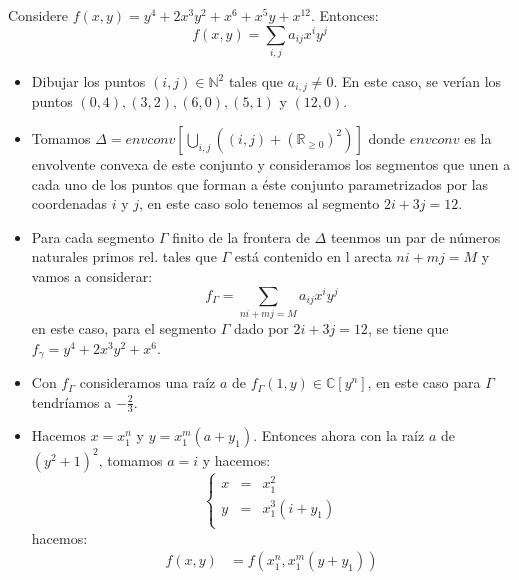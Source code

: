\documentclass[12pt]{report}
\newcounter{it}
\theoremstyle{largebreak}
\begin{document}
    \begin{exa}
        Considere $f(x,y)=y^4+2x^3y^2+x^6+x^5y+x^12$. Entonces:
        \begin{equation*}
            f(x,y)=\sum_{i,j}a_{ ij}x^iy^j
        \end{equation*}
        \begin{itemize}
            \item Dibujar los puntos $(i,j)\in\mathbb{N}^2$ tales que $a_{ i,j}\neq0$. En este caso, se verían los puntos $(0,4),(3,2),(6,0),(5,1)$ y $(12,0)$.
            \item Tomamos $\Delta=envconv\left[\bigcup_{ i,j}\left((i,j)+(\mathbb{R}_{\geq0})^2\right)\right]$ donde $envconv$ es la envolvente convexa de este conjunto y consideramos los segmentos que unen a cada uno de los puntos que forman a éste conjunto parametrizados por las coordenadas $i$ y $j$, en este caso solo tenemos al segmento $2i+3j=12$.
            \item Para cada segmento $\Gamma$ finito de la frontera de $\Delta$ teenmos un par de números naturales primos rel. tales que $\Gamma$ está contenido en l arecta $ni+mj=M$ y vamos a considerar:
            \begin{equation*}
                f_\Gamma=\sum_{ ni+mj=M}a_{ij}x^iy^j
            \end{equation*}
            en este caso, para el segmento $\Gamma$ dado por $2i+3j=12$, se tiene que $f_\gamma=y^4+2x^3y^2+x^6$.
            \item Con $f_\Gamma$ consideramos una raíz $a$ de $f_\Gamma(1,y)\in\mathbb{C}[y^n]$, en este caso para $\Gamma$ tendríamos a $-\frac{2}{3}$.
            \item Hacemos $x=x_1^n$ y $y=x_1^m(a+y_1)$. Entonces ahora con la raíz $a$ de $(y^2+1)^2$, tomamos $a=i$ y hacemos:
            \begin{equation*}
                \left\{
                    \begin{array}{rcl}
                        x & = & x_1^2\\
                        y & = & x_1^3(i+y_1)\\
                    \end{array}
                \right.
            \end{equation*}
            hacemos:
            \begin{equation*}
                \begin{split}
                    f(x,y)&=f(x_1^n,x_1^m(y+y_1))\\

\end{split}
\end{equation*}
\end{itemize}
\end{exa}
\end{document}
